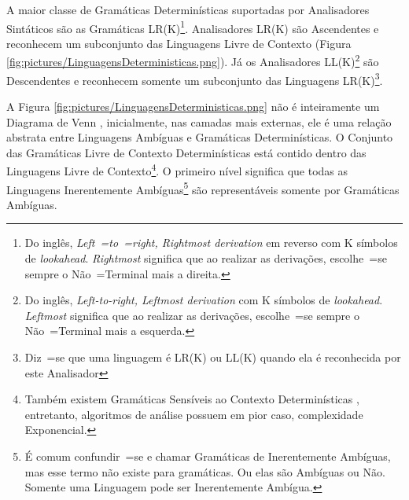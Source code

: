 {    A maior classe de Gramáticas Determinísticas suportadas por Analisadores Sintáticos são as Gramáticas LR(K)\footnote{
    Do inglês, \textit{Left~=to~=right,
    Rightmost derivation} em reverso com K símbolos de \textit{lookahead}.
    \textit{Rightmost} significa que ao realizar as derivações,
    escolhe~=se sempre o Não~=Terminal mais a direita.
    }.
    Analisadores LR(K) \cite{ahoCompilerDragonBook} são Ascendentes e
    reconhecem um subconjunto das Linguagens Livre de Contexto (Figura \ref{fig:pictures/LinguagensDeterministicas.png}).
    Já os Analisadores LL(K)\footnote{
    Do inglês, \textit{Left-to-right,
    Leftmost derivation} com K símbolos de \textit{lookahead}.
    \textit{Leftmost} significa que ao realizar as derivações,
    escolhe~=se sempre o Não~=Terminal mais a esquerda.
    }
    são Descendentes \cite{antlrBookTerrentParr} e
    reconhecem somente um subconjunto das Linguagens LR(K)\footnote{
    Diz~=se que uma linguagem é LR(K) ou
    LL(K) quando ela é reconhecida por este Analisador
    }.

    A Figura \ref{fig:pictures/LinguagensDeterministicas.png} não é inteiramente um Diagrama de Venn \cite{generalizedVennDiagrams},
    inicialmente,
    nas camadas mais externas,
    ele é uma relação abstrata entre Linguagens Ambíguas e
    Gramáticas Determinísticas.
    O Conjunto das Gramáticas Livre de Contexto Determinísticas está contido dentro das Linguagens Livre de Contexto\footnote{
    Também existem Gramáticas Sensíveis ao Contexto Determinísticas \cite{contextSensitiveParsing},
    entretanto,
    algoritmos de análise possuem em pior caso,
    complexidade Exponencial.
    }.
    O primeiro nível significa que todas as Linguagens Inerentemente Ambíguas\footnote{
    É comum confundir~=se e
    chamar Gramáticas de Inerentemente Ambíguas,
    mas esse termo não existe para gramáticas.
    Ou elas são Ambíguas ou
    Não.
    Somente uma Linguagem pode ser Inerentemente Ambígua.
    }
    são representáveis somente por Gramáticas Ambíguas.

}
